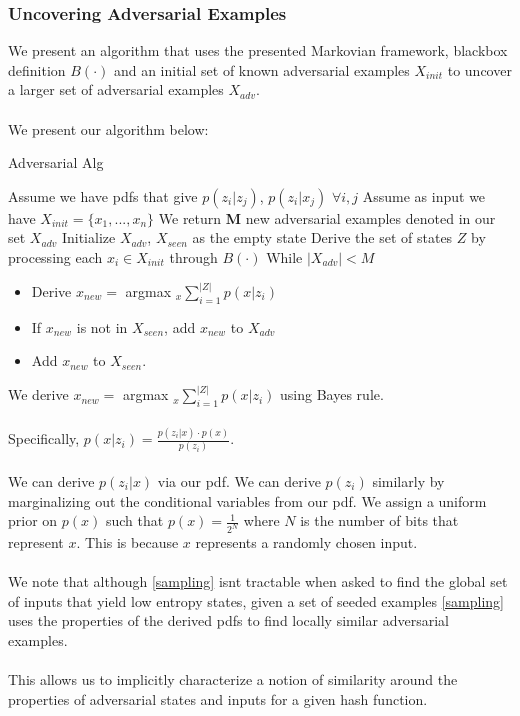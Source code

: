 \documentclass[letterpaper,twocolumn,10pt]{article}
\begin{document}
\subsubsection{Uncovering Adversarial Examples}
We present an algorithm that uses the presented Markovian framework, blackbox definition $B(\cdot)$ and an initial set of known adversarial examples $X_{init}$ to uncover a larger set of adversarial examples $X_{adv}$. 
\\
\\
We present our algorithm below:

\begin{algorithm} \label{alg:adv}
\caption{Adversarial Alg}\label{sampling}
\begin{algorithmic}[1]
\State Assume we have pdfs that give $p(z_{i} | z_{j})$, $p(z_{i} | x_{j})$ $\forall i,j$
\State Assume as input we have $X_{init} = \{x_{1}, ..., x_{n}\}$
\State We return \textbf{M} new adversarial examples denoted in our set $X_{adv}$
\State Initialize $X_{adv}$, $X_{seen}$ as the empty state
\State Derive the set of states $Z$ by processing each $x_{i} \in X_{init}$ through $B(\cdot)$
\State While $|X_{adv} | < M$
\begin{itemize}
\item Derive $x_{new} =$ argmax $_{x} \sum_{i=1}^{|Z|} p(x | z_{i})$
\item If $x_{new}$ is not in $X_{seen}$, add $x_{new}$ to $X_{adv}$
\item Add $x_{new}$ to $X_{seen}$.
\end{itemize}
\end{algorithmic}
\end{algorithm}

We derive $x_{new} =$ argmax $_{x} \sum_{i=1}^{|Z|} p(x | z_{i})$ using Bayes rule. 
\\
\\
Specifically, $p(x | z_{i}) = \frac{p(z_{i} | x) \cdot p(x)}{p(z_{i})}$. 
\\
\\
We can derive $p(z_{i} | x)$ via our pdf. We can derive $p(z_{i})$ similarly by marginalizing out the conditional variables from our pdf. We assign a uniform prior on $p(x)$ such that $p(x) = \frac{1}{2^{N}}$ where $N$ is the number of bits that represent $x$. This is because $x$ represents a randomly chosen input.
\\
\\
We note that although \ref{sampling} isnt tractable when asked to find the global set of inputs that yield low entropy states, given a set of seeded examples \ref{sampling} uses the properties of the derived pdfs to find locally similar adversarial examples. 
\\
\\
This allows us to implicitly characterize a notion of similarity around the properties of adversarial states and inputs for a given hash function. 
\end{document}
